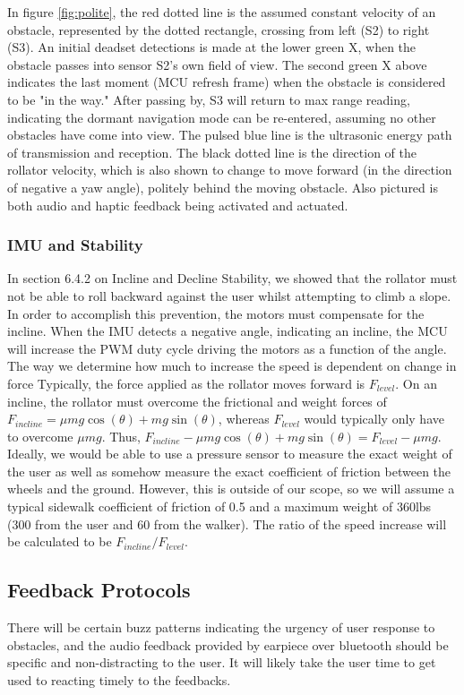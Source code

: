 \noindent In figure \ref{fig:polite}, the red dotted line is the assumed constant velocity of an obstacle, represented by the dotted rectangle, crossing from left (S2) to right (S3). An initial deadset detections is made at the lower green X, when the obstacle passes into sensor S2's own field of view. The second green X above indicates the last moment (MCU refresh frame) when the obstacle is considered to be "in the way." After passing by, S3 will return to max range reading, indicating the dormant navigation mode can be re-entered, assuming no other obstacles have come into view. The pulsed blue line is the ultrasonic energy path of transmission and reception. The black dotted line is the direction of the rollator velocity, which is also shown to change to move forward (in the direction of negative a yaw angle), politely behind the moving obstacle. Also pictured is both audio and haptic feedback being activated and actuated.

\subsubsection{IMU and Stability}
\noindent In section 6.4.2 on Incline and Decline Stability, we showed that the rollator must not be able to roll backward against the user whilst attempting to climb a slope. In order to accomplish this prevention, the motors must compensate for the incline. When the IMU detects a negative angle, indicating an incline, the MCU will increase the PWM duty cycle driving the motors as a function of the angle. The way we determine how much to increase the speed is dependent on change in force Typically, the force applied as the rollator moves forward is $F_{level}$. On an incline, the rollator must overcome the frictional and weight forces of  $F_{incline} = \mu m g \cos(\theta) + m g \sin(\theta)$, whereas $F_{level}$ would typically only have to overcome $\mu m g$. Thus, $F_{incline} - \mu m g \cos(\theta) + m g \sin(\theta)  = F_{level} - \mu m g$. Ideally, we would be able to use a pressure sensor to measure the exact weight of the user as well as somehow measure the exact coefficient of friction between the wheels and the ground. However, this is outside of our scope, so we will assume a typical sidewalk coefficient of friction of 0.5\cite{osha2003} and a maximum weight of 360lbs (300 from the user and 60 from the walker). The ratio of the speed increase will be calculated to be $F_{incline}/F_{level}$.\\

\subsection{Feedback Protocols}
\noindent There will be certain buzz patterns indicating the urgency of user response to obstacles, and the audio feedback provided by earpiece over bluetooth should be specific and non-distracting to the user. It will likely take the user time to get used to reacting timely to the feedbacks.

